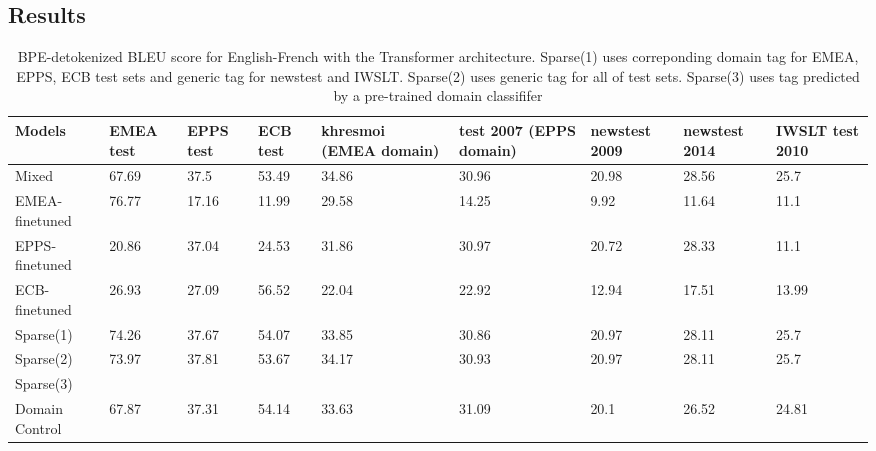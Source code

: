 \documentclass[11pt,a4paper]{article}
\begin{document}
\subsection{Results}
\begin{table}
\begin{center}
 \begin{tabularx}{\textwidth}{|| X | X | X | X | X | X | X | X | X ||} 
 \hline
 Models & EMEA test & EPPS test & ECB test & khresmoi (EMEA domain) & test 2007 (EPPS domain) & newstest 2009 & newstest 2014 & IWSLT test 2010 \\ [0.5ex] 
 \hline\hline
 Mixed & 67.69 & 37.5 & 53.49 & 34.86 & 30.96 & 20.98 & 28.56 & 25.7 \\
 \hline
 EMEA-finetuned & 76.77 & 17.16 & 11.99 & 29.58 & 14.25 & 9.92 & 11.64 & 11.1 \\
 \hline
 EPPS-finetuned & 20.86 & 37.04 & 24.53 & 31.86 & 30.97 & 20.72 & 28.33 & 11.1 \\
 \hline
 ECB-finetuned & 26.93 & 27.09 & 56.52 & 22.04 & 22.92 & 12.94 & 17.51 & 13.99 \\
 \hline
 Sparse(1) & 74.26 & 37.67 & 54.07 & 33.85 & 30.86 & 20.97 & 28.11 & 25.7 \\
 \hline
 Sparse(2) & 73.97 & 37.81 & 53.67 & 34.17 & 30.93 & 20.97 & 28.11 & 25.7 \\
 \hline
 Sparse(3) &  &  &  &  &  &  &  & \\
 \hline
 Domain Control & 67.87 & 37.31 & 54.14 & 33.63 & 31.09 &  20.1 & 26.52 & 24.81\\
 \hline
\end{tabularx}
\end{center}

\caption{BPE-detokenized BLEU score for English-French with the Transformer architecture. Sparse(1) uses correponding domain tag for EMEA, EPPS, ECB test sets and generic tag for newstest and IWSLT. Sparse(2) uses generic tag for all of test sets. Sparse(3) uses tag predicted by a pre-trained domain classififer}
\label{tab:1}
\end{table}
\end{document}

